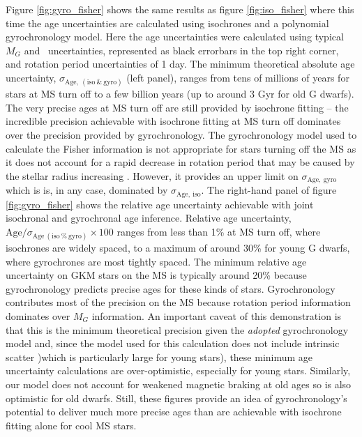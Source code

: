 Figure \ref{fig:gyro_fisher} shows the same results as figure
\ref{fig:iso_fisher} where this time the age uncertainties are calculated
using isochrones and a polynomial gyrochronology model.
Here the age uncertainties were calculated using typical \Gaia\ $M_G$ and
\gcolor\ uncertainties, represented as black errorbars in the top right
corner, and rotation period uncertainties of 1 day.
The minimum theoretical absolute age uncertainty,
$\sigma_{\mathrm{Age,~(iso~\&~gyro)}}$ (left panel), ranges from tens of
millions of years for stars at MS turn off to a few billion years (up to
around 3 Gyr for old G dwarfs).
The very precise ages at MS turn off are still provided by isochrone fitting
-- the incredible precision achievable with isochrone fitting at MS turn off
dominates over the precision provided by gyrochronology.
The gyrochronology model used to calculate the Fisher information is not
appropriate for stars turning off the MS as it does not account for a rapid
decrease in rotation period that may be caused by the stellar radius
increasing \citep[see][]{vansaders2013}.
However, it provides an upper limit on $\sigma_{\mathrm{Age,~gyro}}$ which is
is, in any case, dominated by $\sigma_{\mathrm{Age,~iso}}$.
The right-hand panel of figure \ref{fig:gyro_fisher} shows the relative age
uncertainty achievable with joint isochronal and gyrochronal age inference.
Relative age uncertainty,
$\mathrm{Age}/\sigma_{\mathrm{Age~(iso~\%~gyro)}}\times 100$ ranges from less
than 1\% at MS turn off, where isochrones are widely spaced, to a maximum of
around 30\% for young G dwarfs, where gyrochrones are most tightly spaced.
The minimum relative age uncertainty on GKM stars on the MS is typically
around 20\% because gyrochronology predicts precise ages for these kinds of
stars.
Gyrochronology contributes most of the precision on the MS because rotation
period information dominates over $M_G$ information.
An important caveat of this demonstration is that this is the minimum
theoretical precision given the {\it adopted} gyrochronology model and, since
the model used for this calculation does not include intrinsic scatter )which
is particularly large for young stars), these minimum age uncertainty
calculations are over-optimistic, especially for young stars.
Similarly, our model does not account for weakened magnetic braking at old
ages \citep{vansaders2016} so is also optimistic for old dwarfs.
Still, these figures provide an idea of gyrochronology's potential to deliver
much more precise ages than are achievable with isochrone fitting alone for
cool MS stars.

